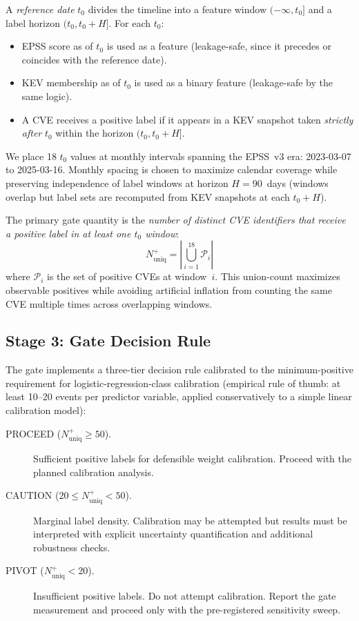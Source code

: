 \documentclass[conference]{IEEEtran}
\begin{document}
A \emph{reference date} $t_0$ divides the timeline into a feature window
$(-\infty, t_0]$ and a label horizon $(t_0, t_0 + H]$. For each $t_0$:
\begin{itemize}
 \item EPSS score as of $t_0$ is used as a feature (leakage-safe, since
 it precedes or coincides with the reference date).
 \item KEV membership as of $t_0$ is used as a binary feature
 (leakage-safe by the same logic).
 \item A CVE receives a positive label if it appears in a KEV snapshot
 taken \emph{strictly after} $t_0$ within the horizon $(t_0, t_0 + H]$.
\end{itemize}

We place 18 $t_0$ values at monthly intervals spanning the EPSS~v3 era:
2023-03-07 to 2025-03-16. Monthly spacing is chosen to maximize calendar
coverage while preserving independence of label windows at horizon
$H = 90$~days (windows overlap but label sets are recomputed from KEV
snapshots at each $t_0 + H$).

The primary gate quantity is the \emph{number of distinct CVE identifiers
that receive a positive label in at least one $t_0$ window}:
\[
 N^+_{\text{uniq}} = \left| \bigcup_{i=1}^{18} \mathcal{P}_i \right|
\]
where $\mathcal{P}_i$ is the set of positive CVEs at window~$i$. This
union-count maximizes observable positives while avoiding artificial inflation
from counting the same CVE multiple times across overlapping windows.

\subsection{Stage 3: Gate Decision Rule}
\label{subsec:gate-decision}

The gate implements a three-tier decision rule calibrated to the
minimum-positive requirement for logistic-regression-class calibration
(empirical rule of thumb: at least 10--20 events per predictor variable,
applied conservatively to a simple linear calibration model):

\begin{description}
 \item[PROCEED ($N^+_{\text{uniq}} \geq 50$).] Sufficient positive labels
 for defensible weight calibration. Proceed with the planned calibration
 analysis.
 \item[CAUTION ($20 \leq N^+_{\text{uniq}} < 50$).] Marginal label
 density. Calibration may be attempted but results must be interpreted
 with explicit uncertainty quantification and additional robustness checks.
 \item[PIVOT ($N^+_{\text{uniq}} < 20$).] Insufficient positive labels.
 Do not attempt calibration. Report the gate measurement and proceed
 only with the pre-registered sensitivity sweep.
\end{description}
\end{document}

